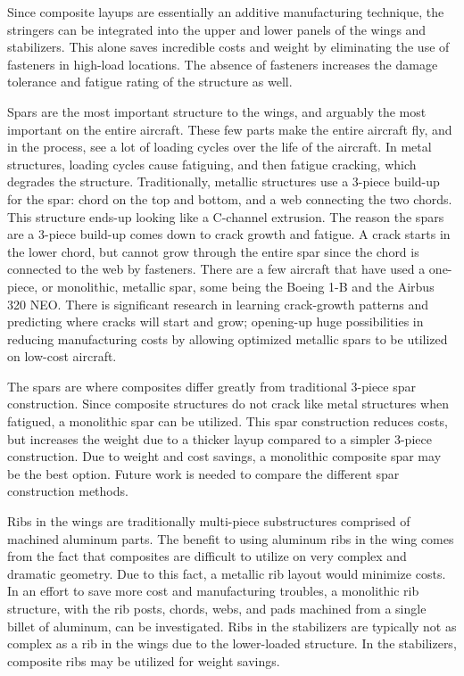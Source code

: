Since composite layups are essentially an additive manufacturing technique, the stringers can be integrated into the upper and lower panels of the wings and stabilizers. This alone saves incredible costs and weight by eliminating the use of fasteners in high-load locations. The absence of fasteners increases the damage tolerance and fatigue rating of the structure as well.

Spars are the most important structure to the wings, and arguably the most important on the entire aircraft. These few parts make the entire aircraft fly, and in the process, see a lot of loading cycles over the life of the aircraft. In metal structures, loading cycles cause fatiguing, and then fatigue cracking, which degrades the structure. Traditionally, metallic structures use a 3-piece build-up for the spar: chord on the top and bottom, and a web connecting the two chords. This structure ends-up looking like a C-channel extrusion. The reason the spars are a 3-piece build-up comes down to crack growth and fatigue. A crack starts in the lower chord, but cannot grow through the entire spar since the chord is connected to the web by fasteners. There are a few aircraft that have used a one-piece, or monolithic, metallic spar, some being the Boeing 1-B and the Airbus 320 NEO. There is significant research in learning crack-growth patterns and predicting where cracks will start and grow; opening-up huge possibilities in reducing manufacturing costs by allowing optimized metallic spars to be utilized on low-cost aircraft.

The spars are where composites differ greatly from traditional 3-piece spar construction. Since composite structures do not crack like metal structures when fatigued, a monolithic spar can be utilized. This spar construction reduces costs, but increases the weight due to a thicker layup compared to a simpler 3-piece construction. Due to weight and cost savings, a monolithic composite spar may be the best option. Future work is needed to compare the different spar construction methods.

Ribs in the wings are traditionally multi-piece substructures comprised of machined aluminum parts. The benefit to using aluminum ribs in the wing comes from the fact that composites are difficult to utilize on very complex and dramatic geometry. Due to this fact, a metallic rib layout would minimize costs. In an effort to save more cost and manufacturing troubles, a monolithic rib structure, with the rib posts, chords, webs, and pads machined from a single billet of aluminum, can be investigated. Ribs in the stabilizers are typically not as complex as a rib in the wings due to the lower-loaded structure. In the stabilizers, composite ribs may be utilized for weight savings.

